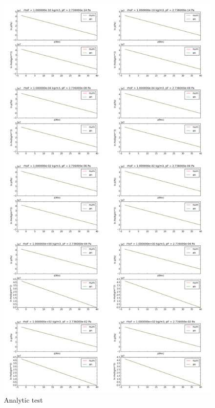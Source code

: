 \documentclass[10pt]{book}
\begin{document}
\begin{figure}[!ht]
 \centering
 \includegraphics[scale=0.5]{allanalytic.png}
 \caption{Analytic test}
\end{figure}
\end{document}
